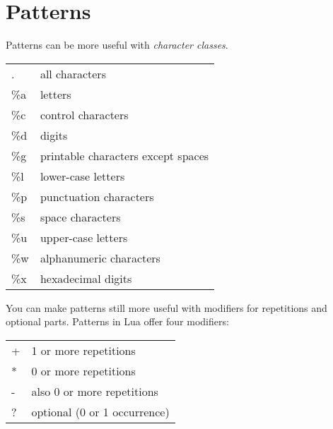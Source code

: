 \section{Patterns}

Patterns can be more useful with \textit{character classes}. 

\begin{longtable}{>{\color{blue}}ll}
. & all characters\\
\%a & letters\\
\%c &control characters\\
\%d &digits\\ 
\%g &printable characters except spaces\\
\%l &lower-case letters\\
\%p &punctuation characters\\
\%s &space characters\\
\%u  &upper-case letters\\
\%w  &alphanumeric characters\\
\%x  &hexadecimal digits\\
\end{longtable}

You can make patterns still more useful with modifiers for repetitions and optional parts. Patterns in Lua offer four modifiers:

\begin{center}
\begin{tabular}{ll}
+	&1 or more repetitions\\
*	&0 or more repetitions\\
-	&also 0 or more repetitions\\
?	&optional (0 or 1 occurrence)\\
\end{tabular}
\end{center}







